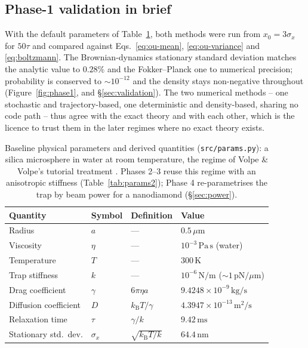 \documentclass[11pt]{article}
\newcommand{\kB}{k_{\mathrm{B}}}
\begin{document}
\subsection{Phase-1 validation in brief}

With the default parameters of Table~\ref{tab:params}, both methods were run from $x_0 = 3\sigma_x$ for $50\tau$ and compared against Eqs.~\eqref{eq:ou-mean}, \eqref{eq:ou-variance} and \eqref{eq:boltzmann}. The Brownian-dynamics stationary standard deviation matches the analytic value to $0.28\%$ and the Fokker--Planck one to numerical precision; probability is conserved to $\sim 10^{-12}$ and the density stays non-negative throughout (Figure~\ref{fig:phase1}, and \S\ref{sec:validation}). The two numerical methods -- one stochastic and trajectory-based, one deterministic and density-based, sharing no code path -- thus agree with the exact theory and with each other, which is the licence to trust them in the later regimes where no exact theory exists.

\begin{table}[h]
\centering
\begin{tabular}{@{}llll@{}}
\toprule
Quantity & Symbol & Definition & Value \\
\midrule
Radius & $a$ & --- & $0.5\,\mu\mathrm{m}$ \\
Viscosity & $\eta$ & --- & $10^{-3}\,\mathrm{Pa\,s}$ (water) \\
Temperature & $T$ & --- & $300\,\mathrm{K}$ \\
Trap stiffness & $k$ & --- & $10^{-6}\,\mathrm{N/m}$ ($\sim 1\,\mathrm{pN}/\mu\mathrm{m}$) \\
\midrule
Drag coefficient & $\gamma$ & $6\pi\eta a$ & $9.4248\times10^{-9}\,\mathrm{kg/s}$ \\
Diffusion coefficient & $D$ & $\kB T/\gamma$ & $4.3947\times10^{-13}\,\mathrm{m^2/s}$ \\
Relaxation time & $\tau$ & $\gamma/k$ & $9.42\,\mathrm{ms}$ \\
Stationary std.\ dev. & $\sigma_x$ & $\sqrt{\kB T/k}$ & $64.4\,\mathrm{nm}$ \\
\bottomrule
\end{tabular}
\caption{Baseline physical parameters and derived quantities (\texttt{src/params.py}): a silica microsphere in water at room temperature, the regime of Volpe \& Volpe's tutorial treatment \cite{VolpeVolpe2013}. Phases 2--3 reuse this regime with an anisotropic stiffness (Table~\ref{tab:params2}); Phase 4 re-parametrises the trap by beam power for a nanodiamond (\S\ref{sec:power}).}
\label{tab:params}
\end{table}
\end{document}

